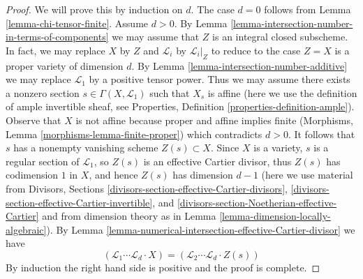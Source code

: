 \documentclass[10pt,a4paper]{amsart}
\theoremstyle{plain}
\theoremstyle{definition}
\theoremstyle{remark}
\numberwithin{equation}{subsection}
\begin{document}
\begin{proof}
We will prove this by induction on $d$. The case $d = 0$
follows from Lemma \ref{lemma-chi-tensor-finite}. Assume $d > 0$.
By Lemma \ref{lemma-intersection-number-in-terms-of-components}
we may assume that $Z$ is an integral closed subscheme.
In fact, we may replace $X$ by $Z$ and $\mathcal{L}_i$
by $\mathcal{L}_i|_Z$ to reduce to the case $Z = X$ is a
proper variety of dimension $d$.
By Lemma \ref{lemma-intersection-number-additive}
we may replace $\mathcal{L}_1$ by a positive tensor power.
Thus we may assume there exists a nonzero section
$s \in \Gamma(X, \mathcal{L}_1)$
such that $X_s$ is affine (here we use the definition of
ample invertible sheaf, see
Properties, Definition \ref{properties-definition-ample}).
Observe that $X$ is not affine because proper and affine
implies finite (Morphisms, Lemma \ref{morphisms-lemma-finite-proper})
which contradicts $d > 0$. It follows that $s$ has a nonempty vanishing
scheme $Z(s) \subset X$. Since $X$ is a variety, $s$ is a regular section
of $\mathcal{L}_1$, so $Z(s)$ is an effective Cartier divisor,
thus $Z(s)$ has codimension $1$ in $X$, and
hence $Z(s)$ has dimension $d - 1$ (here we use material from
Divisors, Sections \ref{divisors-section-effective-Cartier-divisors},
\ref{divisors-section-effective-Cartier-invertible}, and
\ref{divisors-section-Noetherian-effective-Cartier}
and from dimension theory as in Lemma \ref{lemma-dimension-locally-algebraic}).
By Lemma \ref{lemma-numerical-intersection-effective-Cartier-divisor}
we have
$$
(\mathcal{L}_1 \cdots \mathcal{L}_d \cdot X) =
(\mathcal{L}_2 \cdots \mathcal{L}_d \cdot Z(s))
$$
By induction the right hand side is positive and the proof is complete.
\end{proof}
\end{document}
